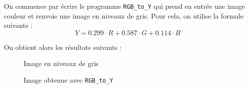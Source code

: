 \documentclass[french,a4paper,10pt]{article}
\begin{document}
    On commence par écrire le programme \texttt{RGB\_to\_Y} qui prend en entrée
    une image couleur et renvoie une image en niveaux de gris.
    Pour cela, on utilise la formule suivante :
    \[
        Y = 0.299 \cdot R + 0.587 \cdot G + 0.114 \cdot B
    \]

    On obtient alors les résultats suivants :
    \begin{figure}[!htb]
        \begin{minipage}{0.48\textwidth}
            \centering
            \caption{Image en niveaux de gris}\label{Fig:peppers-grey-1}
        \end{minipage}\hfill
        \begin{minipage}{0.48\textwidth}
            \centering
            \caption{Image obtenue avec \texttt{RGB\_to\_Y}}\label{Fig:peppers_rgb-to-y}
        \end{minipage}
    \end{figure}
\end{document}
